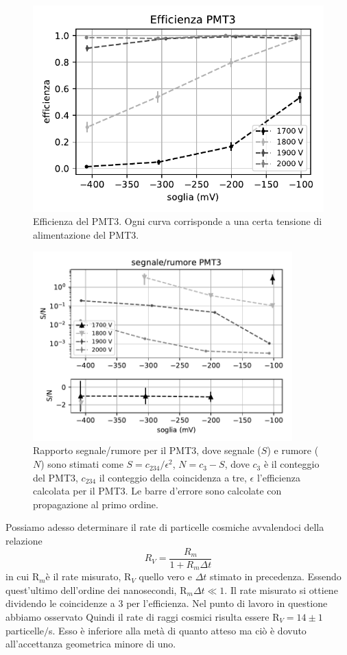\documentclass[a4paper]{article}
\begin{document}
\begin{figure}
	\centering
	\includegraphics[width=8 cm]{efficienza}
	\caption{\label{eff}%
	Efficienza del PMT3.
	Ogni curva corrisponde a una certa tensione di alimentazione del PMT3.}
\end{figure}

\begin{figure}
	\centering
	\includegraphics[width=10cm]{SN3}
	\caption{%
	\label{fig:sn3}%
	Rapporto segnale/rumore per il PMT3,
	dove segnale ($S$) e rumore ($N$) sono stimati come
	$S=c_{234}/\epsilon^2$,
	$N=c_3 - S$,
	dove $c_3$ è il conteggio del PMT3,
	$c_{234}$ il conteggio della coincidenza a tre,
	$\epsilon$ l'efficienza calcolata per il PMT3.
	Le barre d'errore sono calcolate con propagazione al primo ordine.}
\end{figure}

Possiamo adesso determinare il rate di particelle cosmiche avvalendoci della relazione 
$$ R_V=\frac{R_m}{1+R_m\Delta t} $$
in cui R$_m$è il rate misurato, R$_V$ quello vero e $\Delta t$ stimato in precedenza. Essendo quest'ultimo dell'ordine dei nanosecondi, R$_m\Delta t \ll 1$. Il rate misurato si ottiene dividendo le coincidenze a 3 per l'efficienza. Nel punto di lavoro in questione abbiamo osservato Quindi il rate di raggi cosmici risulta essere R$_V=14\pm1$\! particelle$/$s. Esso è inferiore alla metà di quanto atteso ma ciò è dovuto all'accettanza geometrica minore di uno.
\end{document}

